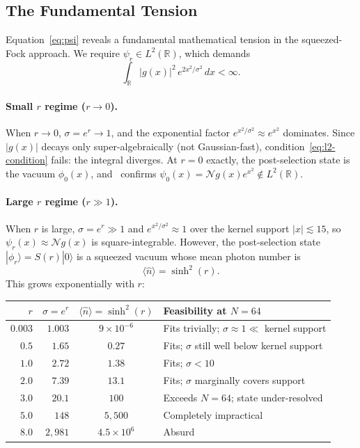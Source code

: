 \documentclass[11pt]{article}
\begin{document}
\subsection{The Fundamental Tension}\label{sec:tension}

Equation~\eqref{eq:psi} reveals a fundamental mathematical tension in the
squeezed-Fock approach.  We require $\psi_r \in L^2(\mathbb{R})$, which demands
\begin{equation}\label{eq:l2-condition}
  \int_{\mathbb{R}} |g(x)|^2\,e^{2x^2/\sigma^2}\,dx < \infty.
\end{equation}

\paragraph{Small $r$ regime ($r \to 0$).}
When $r \to 0$, $\sigma = e^r \to 1$, and the exponential factor
$e^{x^2/\sigma^2} \approx e^{x^2}$ dominates.  Since $|g(x)|$ decays only
super-algebraically (not Gaussian-fast), condition~\eqref{eq:l2-condition}
fails: the integral diverges.  At $r = 0$ exactly, the post-selection state
is the vacuum $\phi_0(x)$, and~\cite[Eq.~10]{das2025} confirms
$\psi_0(x) = \mathcal{N}g(x)e^{x^2} \notin L^2(\mathbb{R})$.

\paragraph{Large $r$ regime ($r \gg 1$).}
When $r$ is large, $\sigma = e^r \gg 1$ and $e^{x^2/\sigma^2} \approx 1$ over
the kernel support $|x| \lesssim 15$, so $\psi_r(x) \approx \mathcal{N}g(x)$
is square-integrable.  However, the post-selection state $|\phi_r\rangle = S(r)|0\rangle$
is a squeezed vacuum whose mean photon number is
\begin{equation}\label{eq:nbar}
  \langle\hat{n}\rangle = \sinh^2(r).
\end{equation}
This grows exponentially with $r$:

\begin{center}
\begin{tabular}{rrcl}
  \toprule
  $r$ & $\sigma = e^r$ & $\langle\hat{n}\rangle = \sinh^2(r)$ & Feasibility at $N = 64$ \\
  \midrule
  $0.003$ & $1.003$ & $9\times10^{-6}$ & Fits trivially; $\sigma \approx 1 \ll$ kernel support \\
  $0.5$ & $1.65$ & $0.27$ & Fits; $\sigma$ still well below kernel support \\
  $1.0$ & $2.72$ & $1.38$ & Fits; $\sigma < 10$ \\
  $2.0$ & $7.39$ & $13.1$ & Fits; $\sigma$ marginally covers support \\
  $3.0$ & $20.1$ & $100$ & Exceeds $N = 64$; state under-resolved \\
  $5.0$ & $148$ & $5{,}500$ & Completely impractical \\
  $8.0$ & $2{,}981$ & $4.5\times10^6$ & Absurd \\
  \bottomrule
\end{tabular}
\end{center}
\end{document}
